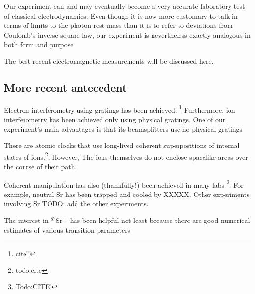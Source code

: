 Our experiment can and may eventually become a very accurate laboratory test of classical electrodynamics.
Even though it is now more customary to talk in terms of limits to the photon rest mass than it is to refer to deviations from Coulomb's inverse square law, our experiment is nevertheless exactly analogous in both form and purpose

The best recent electromagnetic measurements will be discussed here. 

\subsection{More recent antecedent}
Electron interferometry using gratings has been achieved. \footnote{cite!!} Furthermore, ion interferometry has been achieved only using physical gratings. One of our experiment's main advantages is that its beamsplitters use no physical gratings

There are atomic clocks that use long-lived coherent superpositions of internal states of ions.\footnote{todo:cite}. However, The ions themselves do not enclose spacelike areas over the course of their path.

Coherent manipulation has also (thankfully!) been achieved in many labs \footnote{Todo:CITE!}. For example, neutral Sr has been trapped and cooled by XXXXX. 
Other experiments involving Sr TODO: add the other experiments.

The interest in $^{87}$Sr+ has been helpful not least because there are good numerical estimates of various transition parameters \cite{safronovaTheory}


